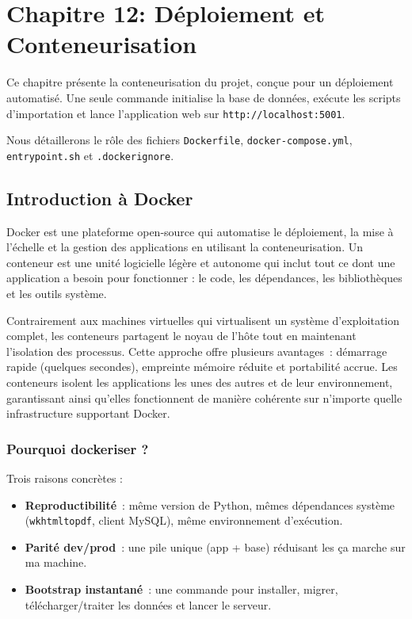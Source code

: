 \chapter{Chapitre 12: Déploiement et Conteneurisation}
\label{chap:deploiement}

Ce chapitre présente la conteneurisation du projet, conçue pour un déploiement automatisé. Une seule commande initialise la base de données, exécute les scripts d'importation et lance l'application web sur \texttt{http://localhost:5001}.

Nous détaillerons le rôle des fichiers \texttt{Dockerfile}, \texttt{docker-compose.yml}, \texttt{entrypoint.sh} et \texttt{.dockerignore}.

\section{Introduction à Docker}
Docker est une plateforme open-source qui automatise le déploiement, la mise à l'échelle et la gestion des applications en utilisant la conteneurisation. Un conteneur est une unité logicielle légère et autonome qui inclut tout ce dont une application a besoin pour fonctionner : le code, les dépendances, les bibliothèques et les outils système. 

Contrairement aux machines virtuelles qui virtualisent un système d'exploitation complet, les conteneurs partagent le noyau de l'hôte tout en maintenant l'isolation des processus. Cette approche offre plusieurs avantages : démarrage rapide (quelques secondes), empreinte mémoire réduite et portabilité accrue. Les conteneurs isolent les applications les unes des autres et de leur environnement, garantissant ainsi qu'elles fonctionnent de manière cohérente sur n'importe quelle infrastructure supportant Docker.

\subsection{Pourquoi dockeriser ?}

Trois raisons concrètes :
\begin{itemize}
  \item \textbf{Reproductibilité} : même version de Python, mêmes dépendances système (\texttt{wkhtmltopdf}, client MySQL), même environnement d'exécution.
  \item \textbf{Parité dev/prod} : une pile unique (app + base) réduisant les \og ça marche sur ma machine\fg{}.
  \item \textbf{Bootstrap instantané} : une commande pour installer, migrer, télécharger/traiter les données et lancer le serveur.
\end{itemize}

